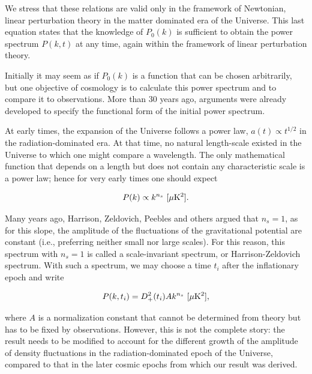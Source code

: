 \documentclass[a4paper,11pt]{article}
\begin{document}
{\noindent}We stress that these relations are valid only in the framework of Newtonian, linear perturbation theory in the matter dominated era of the Universe. This last equation states that the knowledge of $P_0(k)$ is sufficient to obtain the power spectrum $P(k,t)$ at any time, again within the framework of linear perturbation theory.

{\noindent}Initially it may seem as if $P_0(k)$ is a function that can be chosen arbitrarily, but one objective of cosmology is to calculate this power spectrum and to compare it to observations. More than 30 years ago, arguments were already developed to specify the functional form of the initial power spectrum.

{\noindent}At early times, the expansion of the Universe follows a power law, $a(t)\propto t^{1/2}$ in the radiation-dominated era. At that time, no natural length-scale existed in the Universe to which one might compare a wavelength. The only mathematical function that depends on a length but does not contain any characteristic scale is a power law; hence for very early times one should expect

\begin{align*}
    P(k) \propto k^{n_s}  ~ [{\rm \mu K^2}].
\end{align*}

{\noindent}Many years ago, Harrison, Zeldovich, Peebles and others argued that $n_s=1$, as for this slope, the amplitude of the fluctuations of the gravitational potential are constant (i.e., preferring neither small nor large scales). For this reason, this spectrum with $n_s=1$ is called a scale-invariant spectrum, or Harrison-Zeldovich spectrum. With such a spectrum, we may choose a time $t_i$ after the inflationary epoch and write

\begin{align*}
    P(k,t_i) = D_+^2(t_i)Ak^{n_s} ~ [{\rm \mu K^2}],
\end{align*}

{\noindent}where $A$ is a normalization constant that cannot be determined from theory but has to be fixed by observations. However, this is not the complete story: the result needs to be modified to account for the different growth of the amplitude of density fluctuations in the radiation-dominated epoch of the Universe, compared to that in the later cosmic epochs from which our result was derived.
\end{document}
